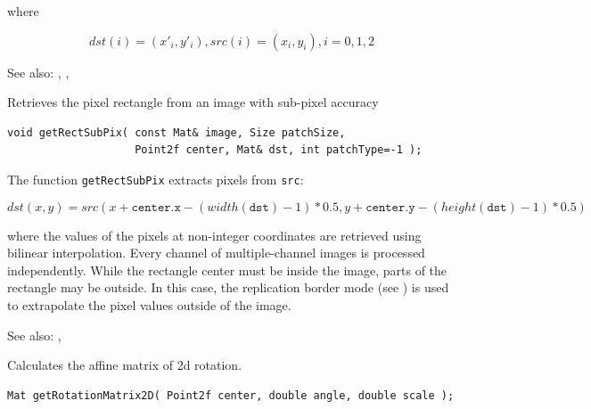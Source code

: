 where

\[
dst(i)=(x'_i,y'_i),
src(i)=(x_i, y_i),
i=0,1,2
\]

See also: , , 

\label{getRectSubPix}
Retrieves the pixel rectangle from an image with sub-pixel accuracy

\begin{lstlisting}
void getRectSubPix( const Mat& image, Size patchSize,
                    Point2f center, Mat& dst, int patchType=-1 );
\end{lstlisting}
\begin{description}
\end{description}

The function \texttt{getRectSubPix} extracts pixels from \texttt{src}:

\[
dst(x, y) = src(x + \texttt{center.x} - (width(\texttt{dst})-1)*0.5, y + \texttt{center.y} - (height(\texttt{dst} )-1)*0.5)
\]

where the values of the pixels at non-integer coordinates are retrieved
using bilinear interpolation. Every channel of multiple-channel
images is processed independently. While the rectangle center
must be inside the image, parts of the rectangle may be
outside. In this case, the replication border mode (see ) is used to extrapolate
the pixel values outside of the image.

See also: , 

\label{getRotationMatrix2D}
Calculates the affine matrix of 2d rotation.

\begin{lstlisting}
Mat getRotationMatrix2D( Point2f center, double angle, double scale );
\end{lstlisting}
\begin{description}
\end{description}

